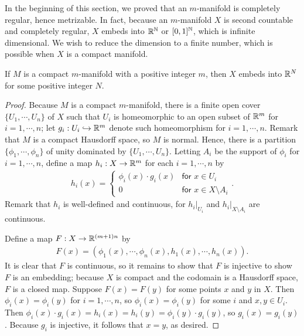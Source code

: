 In the beginning of this section, we proved that an $m$-manifold is completely regular, hence metrizable.
In fact, because an $m$-manifold $X$ is second countable and completely regular, $X$ embeds into ${\mathbb{R}}^{\mathbb{N}}$ or $[0, 1]^{\mathbb{N}}$, which is infinite dimensional.
We wish to reduce the dimension to a finite number, which is possible when $X$ is a compact manifold.
\begin{thm}
    If $M$ is a compact $m$-manifold with a positive integer $m$, then $X$ embeds into ${\mathbb{R}}^N$ for some positive integer $N$.
\end{thm}
\begin{proof}
    Because $M$ is a compact $m$-manifold, there is a finite open cover $\{U_1, \cdots, U_n\}$ of $X$ such that $U_i$ is homeomorphic to an open subset of ${\mathbb{R}}^m$ for $i=1, \cdots, n$; let $g_i: U_i\hookrightarrow{\mathbb{R}}^m$ denote such homeomorphism for $i=1, \cdots, n$.
    Remark that $M$ is a compact Hausdorff space, so $M$ is normal.
    Hence, there is a partition $\{\phi_1, \cdots, \phi_n\}$ of unity dominated by $\{U_1, \cdots, U_n\}$.
    Letting $A_i$ be the support of $\phi_i$ for $i=1, \cdots, n$, define a map $h_i: X\rightarrow{\mathbb{R}}^m$ for each $i=1, \cdots, n$ by
    \begin{align*}
        h_i(x)=\left\{
        \begin{array}{cc}
            \phi_i(x)\cdot g_i(x)   &   \textsf{for $x\in U_i$}\\
                    0               &   \textsf{for $x\in X\setminus A_i$}
        \end{array}\right..
    \end{align*}
    Remark that $h_i$ is well-defined and continuous, for ${h_i}|_{U_i}$ and ${h_i}|_{X\setminus A_i}$ are continuous.

    Define a map $F: X\rightarrow{\mathbb{R}}^{(m+1)n}$ by
    \begin{align*}
        F(x)=(\phi_1(x), \cdots, \phi_n(x), h_1(x), \cdots, h_n(x)).
    \end{align*}
    It is clear that $F$ is continuous, so it remains to show that $F$ is injective to show $F$ is an embedding; because $X$ is compact and the codomain is a Hausdorff space, $F$ is a closed map.
    Suppose $F(x)=F(y)$ for some points $x$ and $y$ in $X$.
    Then $\phi_i(x)=\phi_i(y)$ for $i=1, \cdots, n$, so $\phi_i(x)=\phi_i(y)$ for some $i$ and $x, y\in U_i$.
    Then $\phi_i(x)\cdot g_i(x)=h_i(x)=h_i(y)=\phi_i(y)\cdot g_i(y)$, so $g_i(x)=g_i(y)$.
    Because $g_i$ is injective, it follows that $x=y$, as desired.
\end{proof}